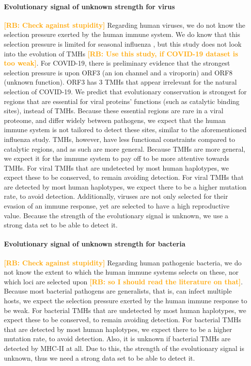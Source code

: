 \documentclass{article}
\newcommand{\richel}[1]{\textcolor{orange}{\textbf{[RB: #1]}}}
\begin{document}
\paragraph{Evolutionary signal of unknown strength for virus}

\richel{Check against stupidity}
Regarding human viruses, we do not know the selection pressure
exerted by the human immune system.
We do know that this selection pressure is 
limited for seasonal influenza \cite{han2019individual},
but this study does not look into the evolution of TMHs
\richel{Use this study, if COVID-19 dataset is too weak}.
For COVID-19, there is preliminary evidence that the strongest
selection pressure is upon ORF3 (an ion channel and a viroporin)
and ORF8 (unknown function). ORF3 has 3 TMHs that appear irrelevant for
the natural selection of COVID-19.
We predict that evolutionary conservation is strongest 
for regions that are essential for viral proteins'
functions (such as catalytic binding sites), instead of TMHs.
Because these essential regions are rare in a viral proteome,
and differ widely between pathogens, we expect that the human immune system
is not tailored to detect these sites, similar to the aforementioned
influenza study. 
TMHs, however, have less 
functional constraints compared to catalytic regions,
and as such are more general. 
Because TMHs are more general,
we expect it for the immune system to pay off to be more attentive towards
TMHs.
For viral TMHs that are undetected by most human haplotypes, we
expect these to be conserved, to remain avoiding detection.
For viral TMHs that are detected by most human haplotypes, we
expect there to be a higher mutation rate, to avoid detection.
Additionally, viruses are not only selected for their evasion of an 
immune response, yet are selected to have a high reproductive value.
Because the strength of the evolutionary signal is unknown,
we use a strong data set to be able to detect it.

\paragraph{Evolutionary signal of unknown strength for bacteria}

\richel{Check against stupidity}
Regarding human pathogenic bacteria, we do not know the extent to which the 
human immune systems selects on these, nor which loci are selected
upon \richel{so I should read the literature on that}.
Because most bacterial pathogens are generalists, that is,
can infect multiple hosts, we expect the selection pressure exerted
by the human immune response to be weak.
For bacterial TMHs that are undetected by most human haplotypes, we
expect these to be conserved, to remain avoiding detection.
For bacterial TMHs that are detected by most human haplotypes, we
expect there to be a higher mutation rate, to avoid detection.
Also, it is unknown if bacterial TMHs are detected by MHC-II at all.
Due to this, the strength of the evolutionary signal is unknown,
thus we need a strong data set to be able to detect it.
\end{document}

